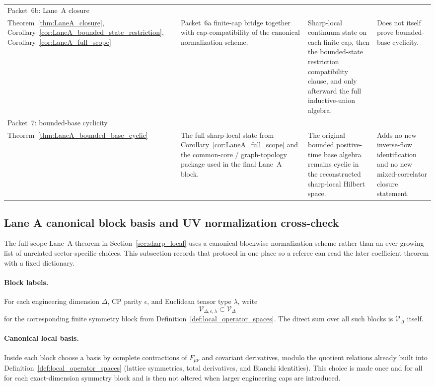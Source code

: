 \begin{longtable}{@{}>{\RaggedRight\arraybackslash}p{}>{\RaggedRight\arraybackslash}p{}>{\RaggedRight\arraybackslash}p{}>{\RaggedRight\arraybackslash}p{}@{}}
Packet~6b: Lane~A closure\\
Theorem~\ref{thm:LaneA_closure}, Corollary~\ref{cor:LaneA_bounded_state_restriction}, Corollary~\ref{cor:LaneA_full_scope}
& Packet~6a finite-cap bridge together with cap-compatibility of the canonical normalization scheme.
& Sharp-local continuum state on each finite cap, then the bounded-state restriction compatibility clause, and only afterward the full inductive-union algebra.
& Does not itself prove bounded-base cyclicity.\\[0.45em]

Packet~7: bounded-base cyclicity\\
Theorem~\ref{thm:LaneA_bounded_base_cyclic}
& The full sharp-local state from Corollary~\ref{cor:LaneA_full_scope} and the common-core / graph-topology package used in the final Lane~A block.
& The original bounded positive-time base algebra remains cyclic in the reconstructed sharp-local Hilbert space.
& Adds no new inverse-flow identification and no new mixed-correlator closure statement.\\
\bottomrule
\end{longtable}
\endgroup


\subsection{Lane A canonical block basis and UV normalization cross-check}

The full-scope Lane~A theorem in Section~\ref{sec:sharp_local} uses a canonical blockwise normalization scheme rather than an ever-growing list of unrelated sector-specific choices.
This subsection records that protocol in one place so a referee can read the later coefficient theorem with a fixed dictionary.

\paragraph{Block labels.}
For each engineering dimension $\Delta$, CP parity $\epsilon$, and Euclidean tensor type $\lambda$,
write
\[
\mathscr V_{\Delta,\epsilon,\lambda}\subset \mathscr V_\Delta
\]
for the corresponding finite symmetry block from Definition~\ref{def:local_operator_spaces}.
The direct sum over all such blocks is $\mathscr V_\Delta$ itself.

\paragraph{Canonical local basis.}
Inside each block choose a basis by complete contractions of $F_{\mu\nu}$ and covariant derivatives,
modulo the quotient relations already built into Definition~\ref{def:local_operator_spaces}
(lattice symmetries, total derivatives, and Bianchi identities).
This choice is made once and for all for each exact-dimension symmetry block and is then not altered when larger engineering caps are introduced.

